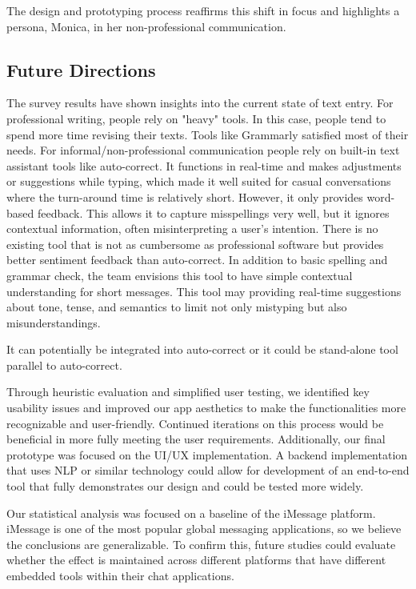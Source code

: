 \documentclass[acmsmall,screen,authorversion,nonacm]{acmart}
\begin{document}
The design and prototyping process reaffirms this shift in focus and highlights a persona, Monica, in her non-professional communication.

\subsection{Future Directions}
The survey results have shown insights into the current state of text entry. For professional writing, people rely on "heavy" tools. In this case, people tend to spend more time revising their texts. Tools like Grammarly satisfied most of their needs. For informal/non-professional communication people rely on built-in text assistant tools like auto-correct. It functions in real-time and makes adjustments or suggestions while typing, which made it well suited for casual conversations where the turn-around time is relatively short. However, it only provides word-based feedback. This allows it to capture misspellings very well, but it ignores contextual information, often misinterpreting a user's intention. There is no existing tool that is not as cumbersome as professional software but provides better sentiment feedback than auto-correct. In addition to basic spelling and grammar check, the team envisions this tool to have simple contextual understanding for short messages. This tool may providing real-time suggestions about tone, tense, and semantics to limit not only mistyping but also misunderstandings. 


It can potentially be integrated into auto-correct or it could be stand-alone tool parallel to auto-correct.

Through heuristic evaluation and simplified user testing, we identified key usability issues and improved our app aesthetics to make the functionalities more recognizable and user-friendly. Continued iterations on this process would be beneficial in more fully meeting the user requirements. Additionally, our final prototype was focused on the UI/UX implementation. A backend implementation that uses NLP or similar technology could allow for development of an end-to-end tool that fully demonstrates our design and could be tested more widely.

Our statistical analysis was focused on a baseline of the iMessage platform. iMessage is one of the most popular global messaging applications, so we believe the conclusions are generalizable. To confirm this, future studies could evaluate whether the effect is maintained across different platforms that have different embedded tools within their chat applications. 
\end{document}

